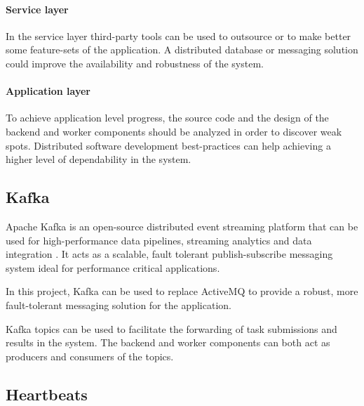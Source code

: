 \paragraph{Service layer} In the service layer third-party tools can be used to outsource or to make better some feature-sets of the application. A distributed database or messaging solution could improve the availability and robustness of the system.

\paragraph{Application layer} To achieve application level progress, the source code and the design of the backend and worker components should be analyzed in order to discover weak spots. Distributed software development best-practices can help achieving a higher level of dependability in the system.

\subsection{Kafka}


Apache Kafka is an open-source distributed event streaming platform that can be used for high-performance data pipelines, streaming analytics and data integration \cite{Kafka}. It acts as a scalable, fault tolerant publish-subscribe messaging system ideal for performance critical applications.

In this project, Kafka can be used to replace ActiveMQ to provide a robust, more fault-tolerant messaging solution for the application.

Kafka topics can be used to facilitate the forwarding of task submissions and results in the system. The backend and worker components can both act as producers and consumers of the topics.

\subsection{Heartbeats}

